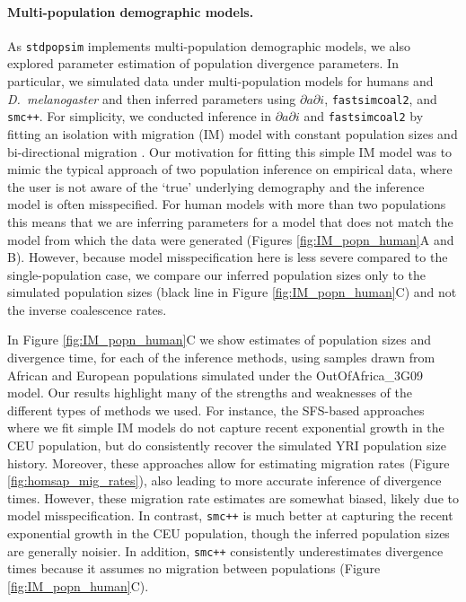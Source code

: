 \documentclass[12pt,halfline,a4paper]{ouparticle}
\newcommand{\stdpopsim}{\texttt{stdpopsim}\xspace}
\newcommand{\dadi}{$\partial a \partial i$\xspace}
\newcommand{\smcpp}{\texttt{smc++}\xspace}
\newcommand{\fastsimcoal}{\texttt{fastsimcoal2}\xspace}
\begin{document}
\paragraph*{Multi-population demographic models.}
As \stdpopsim implements multi-population demographic models, we also
explored parameter estimation of population divergence parameters. In particular,
we simulated data under multi-population models for humans and \textit{D.~melanogaster}
and then inferred  parameters using \dadi, \fastsimcoal, and \smcpp.
For simplicity, we conducted inference in \dadi and \fastsimcoal by fitting an isolation with migration (IM) model
with constant population sizes and bi-directional migration \citep{hey2004im}.
Our motivation for fitting this simple
IM model was to mimic the typical approach of two population inference on empirical
data, where the user is not aware of the `true' underlying demography and the inference
model is often misspecified.
For human models with more than two populations \citep[e.g.,][]{gutenkunst2009inferring}
this means that we are inferring parameters for a model that does
not match the model from which the data were generated (Figures
\ref{fig:IM_popn_human}A and B). However, because model misspecification 
here is less severe compared to the single-population case, we compare
our inferred population sizes only to the simulated population sizes (black line in
Figure \ref{fig:IM_popn_human}C) and not the inverse coalescence rates.

In Figure \ref{fig:IM_popn_human}C we show estimates of population sizes and divergence
time, for each of the inference methods, using samples drawn from African and European populations
simulated under the OutOfAfrica\_3G09 model. Our results highlight many
of the strengths and weaknesses of the different types of methods we used.
For instance, the SFS-based approaches where we fit simple IM models do not capture
recent exponential growth in the CEU population, but do consistently recover the
simulated YRI population size history. Moreover, these approaches allow for estimating
migration rates (Figure \ref{fig:homsap_mig_rates}), also leading to more accurate inference
of divergence times. However, these migration rate estimates are somewhat biased,
likely due to model misspecification.
In contrast, \smcpp is much better at capturing the recent exponential
growth in the CEU population, though the inferred population sizes are generally noisier.
In addition, \smcpp consistently underestimates divergence times
because it assumes no migration between populations (Figure \ref{fig:IM_popn_human}C).
\end{document}
